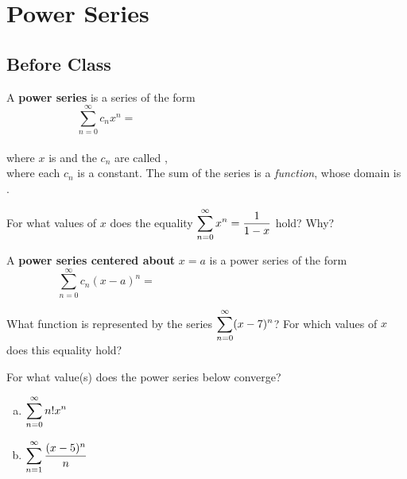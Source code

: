 \documentclass[notes]{subfiles}
\begin{document}
	\fancyhead[LO,RE]{\bfseries \small \currentname}
	\fancyfoot[C]{{}}
	\fancyfoot[RO,LE]{\large \thepage}	%
	
\section*{Power Series}\label{cs118}
	\subsection*{Before Class}
		\begin{defn}
			A \textbf{power series} is a series of the form\\[5pt]
				\[\sum_{n=0}^\infty c_n x^n =\hspace{3in}\]
				\\[10pt]
			where $x$ is  and the $c_n$ are called ,\\[15pt] where each $c_n$ is a constant.  The sum of the series is a \emph{function}, whose domain is\\[15pt] .
		\end{defn}
		
		\begin{ex}
			For what values of $x$ does the equality $\displaystyle \sum_{n=0}^\infty x^n = \dfrac{1}{1-x}$ hold?  Why?
		\end{ex}
			
		\begin{defn}[Power Series (Centered about $x =a$)]
			A \textbf{power series centered about} $x = a$ is a power series of the form\\[5pt]
				\[\sum_{n=0}^\infty c_n(x-a)^n = \hspace{3in}\]
		\end{defn}
		
		\begin{ex}
			What function is represented by the series $\displaystyle \sum_{n=0}^\infty (x-7)^n$?  For which values of $x$ does this equality hold?
		\end{ex}
			\newpage
		
		\begin{ex}
			For what value(s) does the power series below converge?
			\begin{enumerate}[(a)]
				\item $\displaystyle \sum_{n=0}^\infty n!x^n$
					
				\item $\displaystyle \sum_{n=1}^\infty \dfrac{(x-5)^n}{n}$
			\end{enumerate}
		\end{ex}	
		
\end{document}

